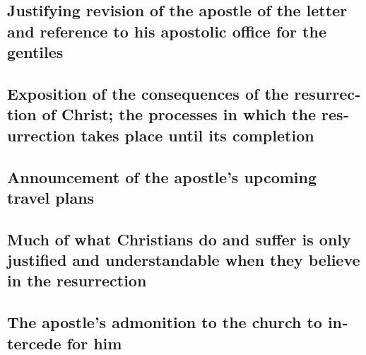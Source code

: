 \begin{paracol}{2}
\begin{otherlanguage}{english}
\hypertarget{justifying-revision-of-the-apostle-of-the-letter-and-reference-to-his-apostolic-office-for-the-gentiles}{%
\subsection{Justifying revision of the apostle of the letter and
reference to his apostolic office for the
gentiles}\label{justifying-revision-of-the-apostle-of-the-letter-and-reference-to-his-apostolic-office-for-the-gentiles}}

\hypertarget{exposition-of-the-consequences-of-the-resurrection-of-christ-the-processes-in-which-the-resurrection-takes-place-until-its-completion}{%
\subsection{Exposition of the consequences of the resurrection of
Christ; the processes in which the resurrection takes place until its
completion}\label{exposition-of-the-consequences-of-the-resurrection-of-christ-the-processes-in-which-the-resurrection-takes-place-until-its-completion}}

\hypertarget{announcement-of-the-apostles-upcoming-travel-plans}{%
\subsection{Announcement of the apostle's upcoming travel
plans}\label{announcement-of-the-apostles-upcoming-travel-plans}}

\hypertarget{much-of-what-christians-do-and-suffer-is-only-justified-and-understandable-when-they-believe-in-the-resurrection}{%
\subsection{Much of what Christians do and suffer is only justified and
understandable when they believe in the
resurrection}\label{much-of-what-christians-do-and-suffer-is-only-justified-and-understandable-when-they-believe-in-the-resurrection}}

\hypertarget{the-apostles-admonition-to-the-church-to-intercede-for-him}{%
\subsection{The apostle's admonition to the church to intercede for
him}\label{the-apostles-admonition-to-the-church-to-intercede-for-him}}

\end{otherlanguage}


\end{paracol}
